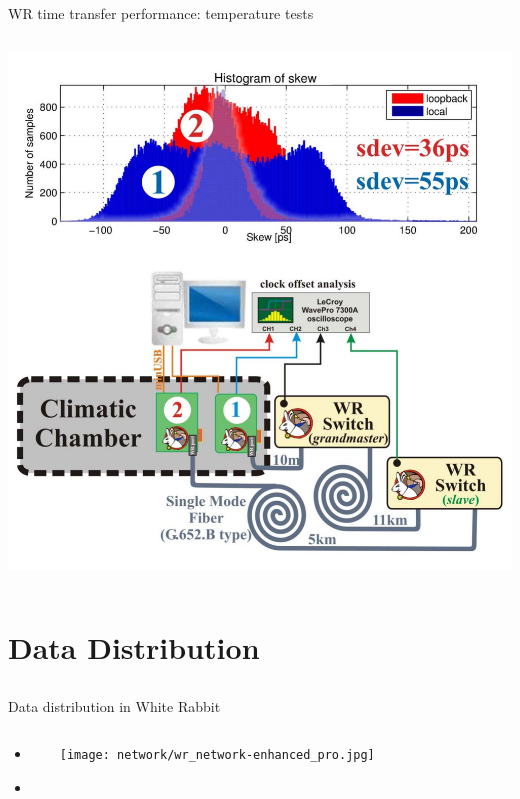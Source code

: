 \documentclass[compress,red]{beamer}
\begin{document}
\begin{frame}{WR time transfer performance: temperature tests}
\begin{columns}[c]
		\hspace{-0.8cm}
		\begin{center}
		\includegraphics[width=1.13\textwidth]{measurements/tempTests-2-combo.pdf}
		\end{center}


  \end{columns} 
\end{frame}
\section{Data Distribution}
\subsection{}
\begin{frame}{Data distribution in White Rabbit}


\begin{columns}[c]
 
  \begin{itemize}
    \item \color{gray}{High accuracy/precision synchronization}
    \item \textbf{\color{red}{Deterministic, reliable and low-latency Control Data delivery}}
  \end{itemize}

    \begin{center}
    \texttt{[image: network/wr\_network-enhanced\_pro.jpg]}
    \end{center}
\end{columns}

\end{frame}
\end{document}
